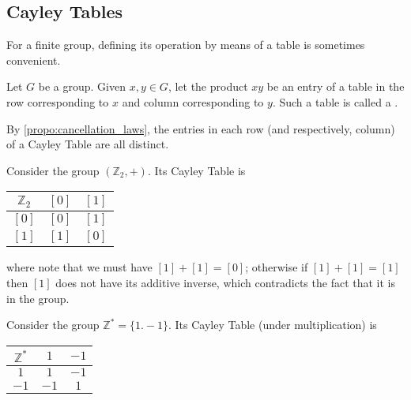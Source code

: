
\subsection{Cayley Tables} %
\label{sub:cayley_tables}

For a finite group, defining its operation by means of a table is sometimes convenient.

\begin{defn}\label{defn:cayley_table}
  Let $G$ be a group. Given $x, y \in G$, let the product $xy$ be an entry of a table in the row corresponding to $x$ and column corresponding to $y$. Such a table is called a .
\end{defn}

\begin{note}
  By \autoref{propo:cancellation_laws}, the entries in each row (and respectively, column) of a Cayley Table are all distinct.
\end{note}

\begin{eg}
  Consider the group $(\mathbb{Z}_2, +)$. Its Cayley Table is
  \begin{center}
    \begin{tabular}{c|c|c}
      $\mathbb{Z}_2$ & $[0]$ & $[1]$ \\
      \hline
      $[0]$     & $[0]$ & $[1]$ \\
      $[1]$     & $[1]$ & $[0]$ 
    \end{tabular}
  \end{center}
  where note that we must have $[1] + [1] = [0]$; otherwise if $[1] + [1] = [1]$ then $[1]$ does not have its additive inverse, which contradicts the fact that it is in the group.
\end{eg}


\begin{eg}
  Consider the group $\mathbb{Z}^* = \{1. -1\}$. Its Cayley Table (under multiplication) is
  \begin{center}
    \begin{tabular}{c|c|c}
      $\mathbb{Z}^*$ & $1$    & $-1$ \\
      \hline
      $1$              & $1$  & $-1$ \\
      $-1$             & $-1$ & $1$
    \end{tabular}
  \end{center}
\end{eg}

